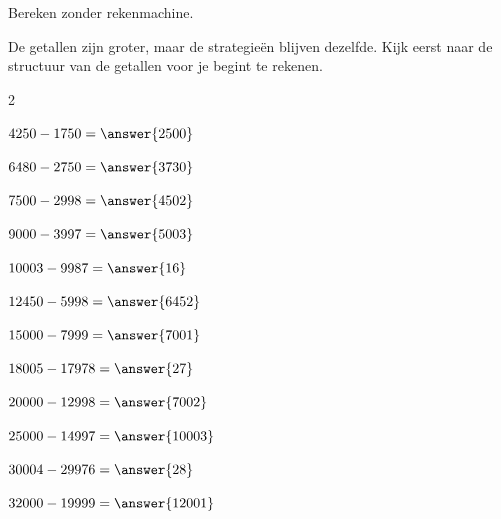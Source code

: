 \documentclass{ximera}
\begin{document}
\begin{oefening}{\oefG}

Bereken zonder rekenmachine.

De getallen zijn groter, maar de strategieën blijven dezelfde.
Kijk eerst naar de structuur van de getallen voor je begint te rekenen.

\begin{multicols}{2}

\begin{question} \(4250-1750=\answer{2500}\) \end{question}

\begin{question} \(6480-2750=\answer{3730}\) \end{question}

\begin{question} \(7500-2998=\answer{4502}\) \end{question}

\begin{question} \(9000-3997=\answer{5003}\) \end{question}

\begin{question} \(10003-9987=\answer{16}\) \end{question}

\begin{question} \(12450-5998=\answer{6452}\) \end{question}

\begin{question} \(15000-7999=\answer{7001}\) \end{question}

\begin{question} \(18005-17978=\answer{27}\) \end{question}

\begin{question} \(20000-12998=\answer{7002}\) \end{question}

\begin{question} \(25000-14997=\answer{10003}\) \end{question}

\begin{question} \(30004-29976=\answer{28}\) \end{question}

\begin{question} \(32000-19999=\answer{12001}\) \end{question}


\end{multicols}
\end{oefening}
\end{document}
